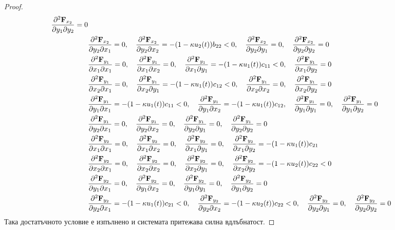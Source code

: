 \begin{proof}
{\begin{align*}
    \pdv{\mathbf{F}_{x_2}}{y_1}{y_2} = 0 \\
    &\pdv{\mathbf{F}_{x_2}}{y_2}{x_1} = 0, \quad
    \pdv{\mathbf{F}_{x_2}}{y_2}{x_2} = -(1-\kappa u_2(t)) b_{22} < 0, \quad
    \pdv{\mathbf{F}_{x_2}}{y_2}{y_1} = 0, \quad
    \pdv{\mathbf{F}_{x_2}}{y_2}{y_2} = 0 \\
    &\pdv{\mathbf{F}_{y_1}}{x_1}{x_1} = 0, \quad
    \pdv{\mathbf{F}_{y_1}}{x_1}{x_2} = 0, \quad
    \pdv{\mathbf{F}_{y_1}}{x_1}{y_1} = -(1-\kappa u_1(t))c_{11} < 0, \quad
    \pdv{\mathbf{F}_{y_1}}{x_1}{y_2} = 0 \\
    &\pdv{\mathbf{F}_{y_1}}{x_2}{x_1} = 0, \quad
    \pdv{\mathbf{F}_{y_1}}{x_2}{y_1} = -(1-\kappa u_1(t))c_{12} < 0, \quad
    \pdv{\mathbf{F}_{y_1}}{x_2}{x_2} = 0, \quad
    \pdv{\mathbf{F}_{y_1}}{x_2}{y_2} = 0 \\
    &\pdv{\mathbf{F}_{y_1}}{y_1}{x_1} = -(1-\kappa u_1(t))c_{11} < 0, \quad
    \pdv{\mathbf{F}_{y_1}}{y_1}{x_2} = -(1-\kappa u_1(t))c_{12}, \quad
    \pdv{\mathbf{F}_{y_1}}{y_1}{y_1} = 0, \quad
    \pdv{\mathbf{F}_{y_1}}{y_1}{y_2} = 0 \\
    &\pdv{\mathbf{F}_{y_1}}{y_2}{x_1} = 0, \quad
    \pdv{\mathbf{F}_{y_1}}{y_2}{x_2} = 0, \quad
    \pdv{\mathbf{F}_{y_1}}{y_2}{y_1} = 0, \quad
    \pdv{\mathbf{F}_{y_1}}{y_2}{y_2} = 0 \\
    &\pdv{\mathbf{F}_{y_2}}{x_1}{x_1} = 0, \quad
    \pdv{\mathbf{F}_{y_2}}{x_1}{x_2} = 0, \quad
    \pdv{\mathbf{F}_{y_2}}{x_1}{y_1} = 0, \quad
    \pdv{\mathbf{F}_{y_2}}{x_1}{y_2} = -(1-\kappa u_1(t)) c_{21} \\
    &\pdv{\mathbf{F}_{y_2}}{x_2}{x_1} = 0, \quad
    \pdv{\mathbf{F}_{y_2}}{x_2}{x_2} = 0, \quad
    \pdv{\mathbf{F}_{y_2}}{x_2}{y_1} = 0, \quad
    \pdv{\mathbf{F}_{y_2}}{x_2}{y_2} = -(1-\kappa u_2(t)) c_{22} < 0 \\
    &\pdv{\mathbf{F}_{y_2}}{y_1}{x_1} = 0, \quad
    \pdv{\mathbf{F}_{y_2}}{y_1}{x_2} = 0, \quad
    \pdv{\mathbf{F}_{y_2}}{y_1}{y_1} = 0, \quad
    \pdv{\mathbf{F}_{y_2}}{y_1}{y_2} = 0 \\
    &\pdv{\mathbf{F}_{y_2}}{y_2}{x_1} = -(1-\kappa u_1(t)) c_{21} < 0, \quad
    \pdv{\mathbf{F}_{y_2}}{y_2}{x_2} = -(1-\kappa u_2(t)) c_{22} < 0, \quad
    \pdv{\mathbf{F}_{y_2}}{y_2}{y_1} = 0, \quad
    \pdv{\mathbf{F}_{y_2}}{y_2}{y_2} = 0
  \end{align*}
}
Така достатъчното условие е изпълнено и системата притежава силна вдлъбнатост.
\end{proof}


